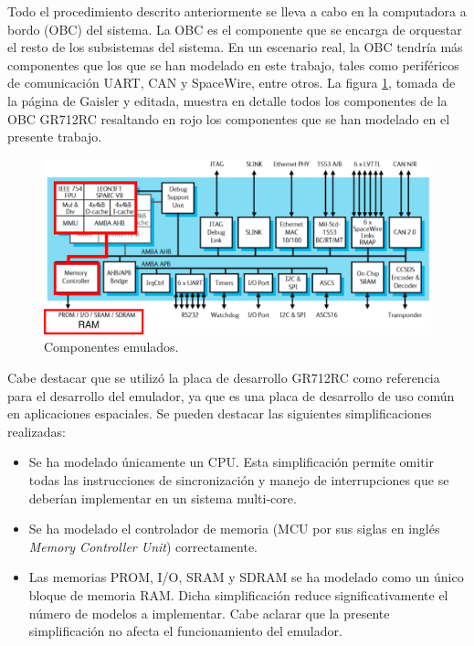 \newpage

Todo el procedimiento descrito anteriormente se lleva a cabo en la computadora a bordo (OBC) del sistema. La OBC es el componente que se encarga de orquestar el resto de los subsistemas del sistema. En un escenario real, la OBC tendría más componentes que los que se han modelado en este trabajo, tales como periféricos de comunicación UART, CAN y SpaceWire, entre otros. La figura \ref{fig:componentes_desarrollados}, tomada de la página de Gaisler \citep{GR712RC} y editada, muestra en detalle todos los componentes de la OBC GR712RC resaltando en rojo los componentes que se han modelado en el presente trabajo.


\begin{figure}[htbp]
	\centering
	\includegraphics[width=1\textwidth]{./Figures/componentes_desarrollados}
	\caption{Componentes emulados.}
	\label{fig:componentes_desarrollados}
\end{figure}
\newpage

Cabe destacar que se utilizó la placa de desarrollo GR712RC como referencia para el desarrollo del emulador, ya que es una placa de desarrollo de uso común en aplicaciones espaciales. Se pueden destacar las siguientes simplificaciones realizadas:

\begin{itemize}
  \item Se ha modelado únicamente un CPU. Esta simplificación permite omitir todas las instrucciones de sincronización y manejo de interrupciones que se deberían implementar en un sistema multi-core.
  \item Se ha modelado el controlador de memoria (MCU por sus siglas en inglés \textit{Memory Controller Unit}) correctamente.
  \item Las memorias PROM, I/O, SRAM y SDRAM se ha modelado como un único bloque de memoria RAM. Dicha simplificación reduce significativamente el número de modelos a implementar. Cabe aclarar que la presente simplificación no afecta el funcionamiento del emulador.
\end{itemize}

